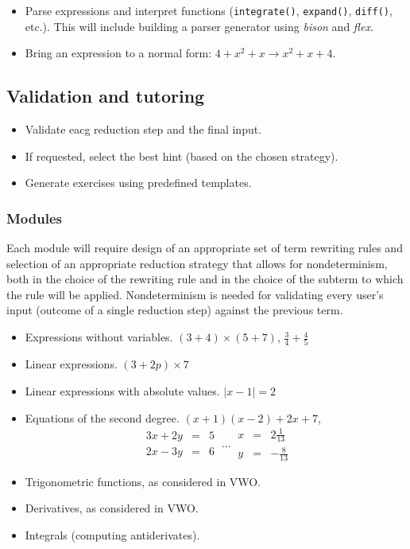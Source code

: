 \documentclass[10pt,a4paper]{article}
\begin{document}
\begin{itemize}
    \item Parse expressions and interpret functions (\texttt{integrate()},
    \texttt{expand()}, \texttt{diff()}, etc.). This will include building a
    parser generator using \emph{bison} and \emph{flex}.
    \item Bring an expression to a normal form:
    $4 + x^2 + x \rightarrow x^2 + x + 4$.
\end{itemize}

\subsection{Validation and tutoring}

\begin{itemize}
    \item Validate eacg reduction step and the final input.
    \item If requested, select the best hint (based on the chosen strategy).
    \item Generate exercises using predefined templates.
\end{itemize}

\subsubsection{Modules}

Each module will require design of an appropriate set of term
rewriting rules and selection of an appropriate reduction strategy
that allows for nondeterminism, both in the choice of the rewriting
rule and in the choice of the subterm to which the rule will be
applied. Nondeterminism is needed for validating every user's input
(outcome of a single reduction step) against the previous term.

\begin{itemize}
    \item Expressions without variables. $(3+4) \times (5+7)$,
    $\frac{3}{4} + \frac{4}{5}$
    \item Linear expressions. $(3+2p) \times 7$
    \item Linear expressions with absolute values. $|x-1| = 2$
    \item Equations of the second degree. $(x+1)(x-2) + 2x + 7$,
    $$ \
    \begin{array}{|rcr|}
    3x + 2y & = & 5 \\
    2x - 3y & = & 6
    \end{array}
    \
    \dots
    \
    \begin{array}{|rcr|}
    x & = & 2\frac{1}{13} \\
    y & = & -\frac{8}{13}
    \end{array}
    $$

    \item Trigonometric functions, as considered in VWO.
    \item Derivatives, as considered in VWO.
    \item Integrals (computing antiderivates).
\end{itemize}
\end{document}
